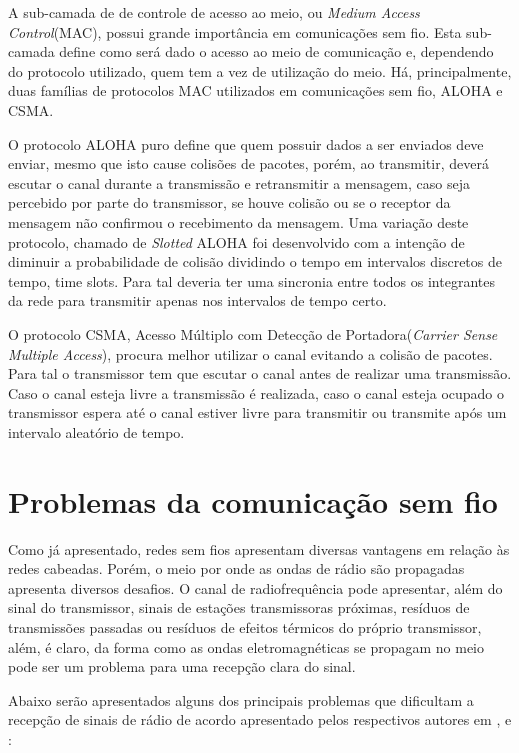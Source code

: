 A sub-camada de de controle de acesso ao meio, ou \emph{Medium Access Control}(MAC), possui grande importância em comunicações sem fio. Esta sub-camada define como será dado o acesso ao meio de comunicação e, dependendo do protocolo utilizado, quem tem a vez de utilização do meio. Há, principalmente, duas famílias de protocolos MAC utilizados em comunicações sem fio, ALOHA e CSMA.

O protocolo ALOHA puro define que quem possuir dados a ser enviados deve enviar, mesmo que isto cause colisões de pacotes, porém, ao transmitir, deverá escutar o canal durante a transmissão e retransmitir a mensagem, caso seja percebido por parte do transmissor, se houve colisão ou se o receptor da mensagem não confirmou o recebimento da mensagem. Uma variação deste protocolo, chamado de \emph{Slotted} ALOHA foi desenvolvido com a intenção de diminuir a probabilidade de colisão dividindo o tempo em intervalos discretos de tempo, time slots. Para tal deveria ter uma sincronia entre todos os integrantes da rede para transmitir apenas nos intervalos de tempo certo.

O protocolo CSMA, Acesso Múltiplo com Detecção de Portadora(\emph{Carrier Sense Multiple Access}), procura melhor utilizar o canal evitando a colisão de pacotes. Para tal o transmissor tem que escutar o canal antes de realizar uma transmissão. Caso o canal esteja livre a transmissão é realizada, caso o canal esteja ocupado o transmissor espera até o canal estiver livre para transmitir ou transmite após um intervalo aleatório de tempo.


\section{Problemas da comunicação sem fio}
Como já apresentado, redes sem fios apresentam diversas vantagens em relação às redes cabeadas. Porém, o meio por onde as ondas de rádio são propagadas apresenta diversos desafios. O canal de radiofrequência pode apresentar, além do sinal do transmissor, sinais de estações transmissoras próximas, resíduos de transmissões passadas ou resíduos de efeitos térmicos do próprio transmissor, além, é claro, da forma como as ondas eletromagnéticas se propagam no meio pode ser um problema para uma recepção clara do sinal.

Abaixo serão apresentados alguns dos principais problemas que dificultam a recepção de sinais de rádio de acordo apresentado pelos respectivos autores em \cite{gomes2017estimaccao}, \cite{rappaport2009} e \cite{rochol2018sistemas}:
